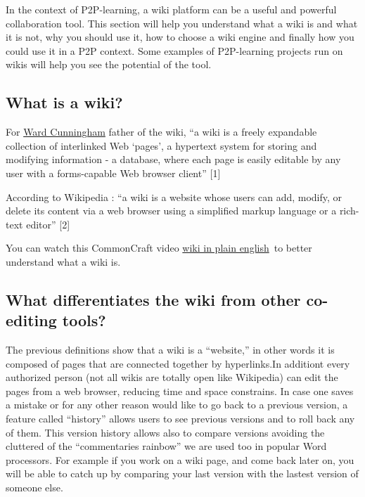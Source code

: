 In the context of P2P-learning, a wiki platform can be a useful and
powerful collaboration tool. This section will help you understand what
a wiki is and what it is not, why you should use it, how to choose a
wiki engine and finally how you could use it in a P2P context. Some
examples of P2P-learning projects run on wikis will help you see the
potential of the tool.

\subsection{What is a wiki?}

For \href{http://en.wikipedia.org/wiki/Ward\_cunningham}{Ward
Cunningham} father of the wiki, ``a wiki is a freely expandable
collection of interlinked Web `pages', a hypertext system for storing
and modifying information - a database, where each page is easily
editable by any user with a forms-capable Web browser client'' {[}1{]}

According to Wikipedia : ``a wiki is a website whose users can add,
modify, or delete its content via a web browser using a simplified
markup language or a rich-text editor'' {[}2{]}

You can watch this CommonCraft video
\href{http://www.youtube.com/watch?v=-dnL00TdmLY}{wiki in plain
english}~to better understand what a wiki is.

\subsection{What differentiates the wiki from other co-editing tools?}

The previous definitions show that a wiki is a ``website,'' in other
words it is composed of pages that are connected together by
hyperlinks.In additiont every authorized person (not all wikis are
totally open like Wikipedia) can edit the pages from a web browser,
reducing time and space constrains. In case one saves a mistake or for
any other reason would like to go back to a previous version, a feature
called ``history'' allows users to see previous versions and to roll
back any of them. This version history allows also to compare versions
avoiding the cluttered of the ``commentaries rainbow'' we are used too
in popular Word processors. For example if you work on a wiki page, and
come back later on, you will be able to catch up by comparing your last
version with the lastest version of someone else.

